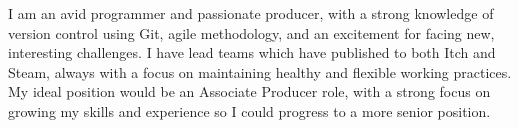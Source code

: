 

\begin{cvparagraph}
    I am an avid programmer and passionate producer, with a strong knowledge of version control using Git, agile methodology, and an excitement for facing new, interesting challenges. I have lead teams which have published to both Itch and Steam, always with a focus on maintaining healthy and flexible working practices. My ideal position would be an Associate Producer role, with a strong focus on growing my skills and experience so I could progress to a more senior position.
\end{cvparagraph}
